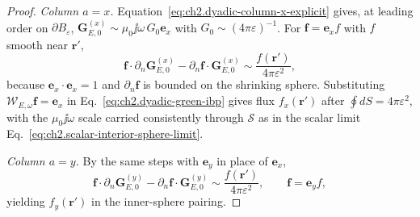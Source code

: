 \begin{proof}
\emph{Column $a=x$.}
Equation~\eqref{eq:ch2.dyadic-column-x-explicit} gives, at leading order on $\partial B_\varepsilon$,
$\mathbf{G}_{E,0}^{(x)}\sim\mu_0\jj\omega\,G_0\mathbf{e}_x$ with $G_0\sim(4\pi\varepsilon)^{-1}$.
For $\mathbf{f}=\mathbf{e}_x f$ with $f$ smooth near $\mathbf{r}'$,
\[
\mathbf{f}\cdot\partial_n\mathbf{G}_{E,0}^{(x)}
-\partial_n\mathbf{f}\cdot\mathbf{G}_{E,0}^{(x)}
\sim
\frac{f(\mathbf{r}')}{4\pi\varepsilon^{2}},
\]
because $\mathbf{e}_x\cdot\mathbf{e}_x=1$ and $\partial_n\mathbf{f}$ is bounded on the shrinking sphere.
Substituting $\mathcal{W}_{E,\omega}\mathbf{f}=\mathbf{e}_x$ in Eq.~\eqref{eq:ch2.dyadic-green-ibp} gives flux
$f_x(\mathbf{r}')$ after $\oint dS=4\pi\varepsilon^2$, with the $\mu_0\jj\omega$ scale carried consistently through
$\boldsymbol{\mathcal{S}}$ as in the scalar limit Eq.~\eqref{eq:ch2.scalar-interior-sphere-limit}.

\emph{Column $a=y$.}
By the same steps with $\mathbf{e}_y$ in place of $\mathbf{e}_x$,
\[
\mathbf{f}\cdot\partial_n\mathbf{G}_{E,0}^{(y)}
-\partial_n\mathbf{f}\cdot\mathbf{G}_{E,0}^{(y)}
\sim
\frac{f(\mathbf{r}')}{4\pi\varepsilon^{2}},
\qquad \mathbf{f}=\mathbf{e}_y f,
\]
yielding $f_y(\mathbf{r}')$ in the inner-sphere pairing.


\end{proof}
